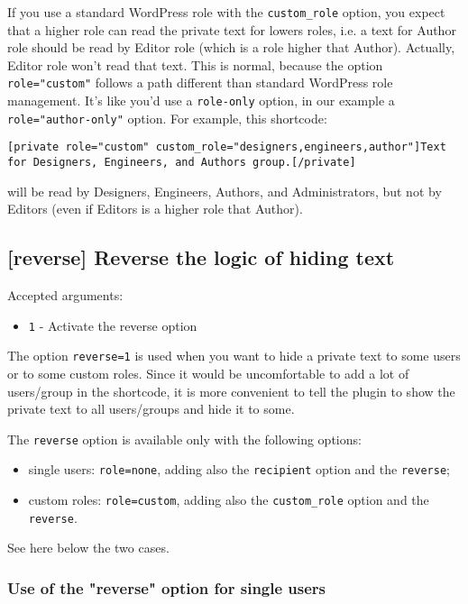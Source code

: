 \documentclass[a4paper,10pt]{article}
\begin{document}
If you use a standard WordPress role with the \verb+custom_role+ option, you expect that a higher role can read the private text for lowers roles, i.e. a text for Author role should be read by Editor role (which is a role higher that Author). Actually, Editor role won't read that text. This is normal, because the option \verb+role="custom"+ follows a path different than standard WordPress role management. It's like you'd use a \verb+role-only+ option, in our example a \verb+role="author-only"+ option. For example, this shortcode:

\begin{lstlisting}
[private role="custom" custom_role="designers,engineers,author"]Text for Designers, Engineers, and Authors group.[/private]
\end{lstlisting}

will be read by Designers, Engineers, Authors, and Administrators, but not by Editors (even if Editors is a higher role that Author).

\subsection{[reverse] Reverse the logic of hiding text}

Accepted arguments:

\begin{itemize}
 \item \verb+1+ - Activate the reverse option
\end{itemize}


The option \verb+reverse=1+ is used when you want to hide a private text to some users or to some custom roles. Since it would be uncomfortable to add a lot of users/group in the shortcode, it is more convenient to tell the plugin to show the private text to all users/groups and hide it to some.

The \verb+reverse+ option is available only with the following options:

\begin{itemize}
 \item single users: \verb+role=none+, adding also the \verb+recipient+ option and the \verb+reverse+;
 \item custom roles: \verb+role=custom+, adding also the \verb+custom_role+ option and the \verb+reverse+.
\end{itemize}

See here below the two cases.

\subsubsection{Use of the "reverse" option for single users}
\end{document}
